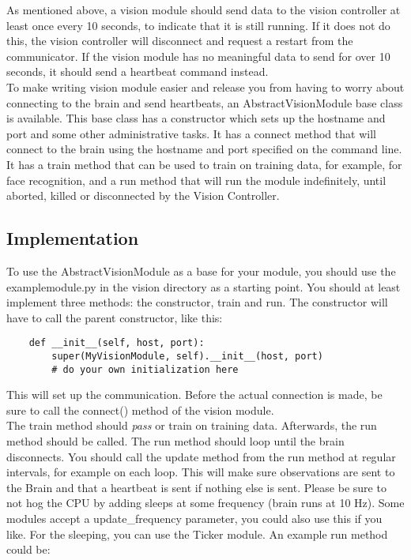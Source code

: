\documentclass[a4paper, 10pt, oneside]{article}
\begin{document}
As mentioned above, a vision module should send data to the vision controller at
least once every 10 seconds, to indicate that it is still running. If it does
not do this, the vision controller will disconnect and request a restart from
the communicator. If the vision module has no meaningful data to send for over
10 seconds, it should send a heartbeat command instead. \\

To make writing vision module easier and release you from having to worry about
connecting to the brain and send heartbeats, an AbstractVisionModule base class
is available. This base class has a constructor which sets up the hostname and
port and some other administrative tasks. It has a connect method that will
connect to the brain using the hostname and port specified on the command line.
It has a train method that can be used to train on training data, for example,
for face recognition, and a run method that will run the module indefinitely,
until aborted, killed or disconnected by the Vision Controller. \\

\subsection{Implementation}
To use the AbstractVisionModule as a base for your module, you should use the
examplemodule.py in the vision directory as a starting point. You should at
least implement three methods: the constructor, train and run. The constructor
will have to call the parent constructor, like this: \\

\begin{lstlisting}
    def __init__(self, host, port):
        super(MyVisionModule, self).__init__(host, port)
        # do your own initialization here
\end{lstlisting}

This will set up the communication. Before the actual connection is made, be
sure to call the connect() method of the vision module. \\

The train method should \textit{pass} or train on training data. Afterwards, the
run method should be called. The run method should loop until the brain
disconnects. You should call the update method from the run method at regular
intervals, for example on each loop. This will make sure observations are sent
to the Brain and that a heartbeat is sent if nothing else is sent. Please be
sure to not hog the CPU by adding sleeps at some frequency (brain runs at 10
Hz). Some modules accept a update\_frequency parameter, you could also use this
if you like. For the sleeping, you can use the Ticker module. An example run
method could be: \\
\end{document}
